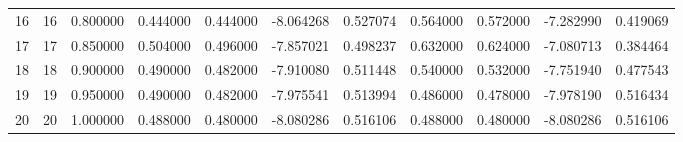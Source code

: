 \begin{tabular}{lrrrrrrrrrr}
16 & 16 & 0.800000 & 0.444000 & 0.444000 & -8.064268 & 0.527074 & 0.564000 & 0.572000 & -7.282990 & 0.419069 \\
17 & 17 & 0.850000 & 0.504000 & 0.496000 & -7.857021 & 0.498237 & 0.632000 & 0.624000 & -7.080713 & 0.384464 \\
18 & 18 & 0.900000 & 0.490000 & 0.482000 & -7.910080 & 0.511448 & 0.540000 & 0.532000 & -7.751940 & 0.477543 \\
19 & 19 & 0.950000 & 0.490000 & 0.482000 & -7.975541 & 0.513994 & 0.486000 & 0.478000 & -7.978190 & 0.516434 \\
20 & 20 & 1.000000 & 0.488000 & 0.480000 & -8.080286 & 0.516106 & 0.488000 & 0.480000 & -8.080286 & 0.516106 \\
\bottomrule
\end{tabular}
